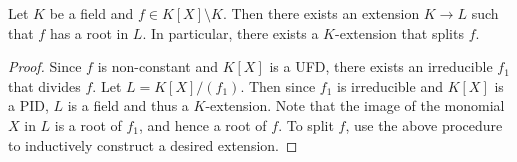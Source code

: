 \documentclass{article}
\begin{document}
\begin{prop} 
  
  Let $K$ be a field and $f \in K[X] \setminus K$.
  Then there exists an extension $K \to L$ such that
  $f$ has a root in $L$. 
  In particular, there exists a $K$-extension that splits $f$. 
\end{prop}
\begin{proof}
  Since $f$ is non-constant and $K[X]$ is a UFD, 
  there exists an irreducible $f_1$ that divides $f$.
  Let $L = K[X] / (f_1)$. 
  Then since $f_1$ is irreducible and $K[X]$ is a PID, 
  $L$ is a field and thus a $K$-extension. 
  Note that the image of the monomial $X$ in $L$ is a root of $f_1$,
  and hence a root of $f$.  
  To split $f$, use the above procedure to 
  inductively construct a desired extension.
\end{proof}
\end{document}
